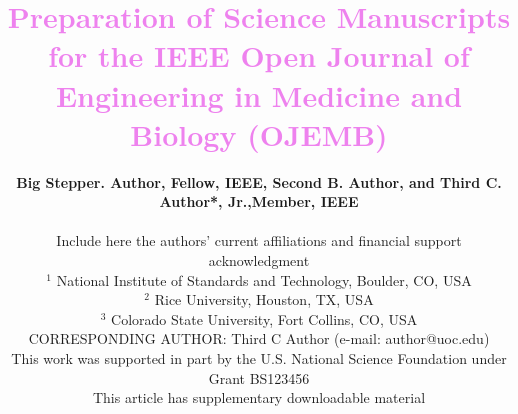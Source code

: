 \documentclass[journal]{IEEEtran}
\makeatletter
\renewcommand{\abstractname}{\textcolor{violet}{\textbf{ABSTRACT}} }
\def\abstract{\@IEEEtweakunitybaselinestretch{1.15}
	\@IEEEabskeysecsize\noindent\abstractname---\relax
	\fi\@IEEEgobbleleadPARNLSP}
\makeatother
\begin{document}
    
	\title{\vspace*{0.5cm}\textcolor{violet}{Preparation of Science Manuscripts for the IEEE Open Journal of Engineering in Medicine and Biology (OJEMB)}
	\vspace*{0.5cm}
	}	
	
	
	\author{\textbf{Big Stepper. Author, Fellow, IEEE, Second B. Author, and Third C. Author*, Jr.,Member, IEEE}\\
		\vspace*{0.1cm}
		
		Include here the authors’ current affiliations and financial support acknowledgment \\
		\vspace*{0.2cm}
		\small
		$^{1}$ National Institute of Standards and Technology, Boulder, CO, USA \\
		$^{2}$ Rice University, Houston, TX, USA \\
		$^{3}$ Colorado State University, Fort Collins, CO, USA \\
		\vspace*{0.1cm}
		CORRESPONDING AUTHOR: Third C Author (e-mail: author@uoc.edu)\\
		\vspace*{0.1cm}
		This work was supported in part by the U.S. National Science Foundation under Grant BS123456\\
		This article has supplementary downloadable material
		\normalsize
		
	}


	
\end{document}
